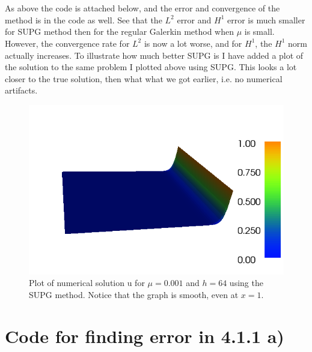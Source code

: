 \documentclass[11pt,a4paper]{report}
\begin{document}
\\
\\
As above the code is attached below, and the error and convergence of the method is in the code as well. See that the $L^2$ error and $H^1$ error is much smaller for SUPG method then for the regular Galerkin method when $\mu$ is small. However, the convergence rate for $L^2$ is now a lot worse, and for $H^1$, the $H^1$ norm actually increases. To illustrate how much better SUPG is I have added a plot of the solution to the same problem I plotted above using SUPG. This looks a lot closer to the true solution, then what what we got earlier, i.e. no numerical artifacts. 
\begin{figure}
  \includegraphics[width=\linewidth]{dolfin_plot_3.png}
  \caption{Plot of numerical solution u for $\mu=0.001$ and $h=64$ using the SUPG method. Notice that the graph is smooth, even at $x=1$. }
  \label{Fig 4}
\end{figure}
  
\section*{Code for finding error in 4.1.1 a)}

\end{document}
